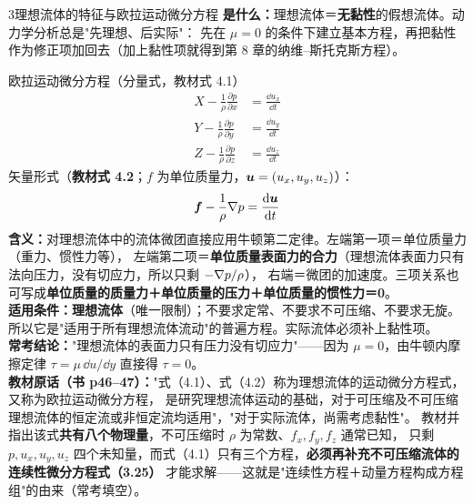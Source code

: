 \begin{kaodian}{3}{理想流体的特征与欧拉运动微分方程}
\textbf{是什么：}理想流体＝\textbf{无黏性}的假想流体。动力学分析总是"先理想、后实际"：
先在 $\mu=0$ 的条件下建立基本方程，再把黏性作为修正项加回去（加上黏性项就得到第 8 章的纳维--斯托克斯方程）。

\begin{gongshi}{欧拉运动微分方程（分量式，教材式 4.1）}
\[
\begin{aligned}
X-\frac{1}{\rho}\frac{\partial p}{\partial x}&=\frac{\dd u_x}{\dd t}\\
Y-\frac{1}{\rho}\frac{\partial p}{\partial y}&=\frac{\dd u_y}{\dd t}\\
Z-\frac{1}{\rho}\frac{\partial p}{\partial z}&=\frac{\dd u_z}{\dd t}
\end{aligned}
\]
矢量形式（\textbf{教材式 4.2}；$f$ 为单位质量力，$\bm{u}=(u_x,u_y,u_z)$）：
\[ \bm{f}-\frac{1}{\rho}\nabla p=\frac{\mathrm{d} \bm{u}}{\mathrm{d} t} \]
\textbf{含义：}对理想流体中的流体微团直接应用牛顿第二定律。左端第一项＝单位质量力（重力、惯性力等），
左端第二项＝\textbf{单位质量表面力的合力}（理想流体表面力只有法向压力，没有切应力，所以只剩 $-\nabla p/\rho$），
右端＝微团的加速度。三项关系也可写成\textbf{单位质量的质量力＋单位质量的压力＋单位质量的惯性力＝0}。\\
\textbf{适用条件：}\textbf{理想流体}（唯一限制）；不要求定常、不要求不可压缩、不要求无旋。
所以它是"适用于所有理想流体流动"的普遍方程。实际流体必须补上黏性项。\\
\textbf{常考结论：}"理想流体的表面力只有压力没有切应力"——因为 $\mu=0$，由牛顿内摩擦定律 $\tau=\mu\,\dd u/\dd y$ 直接得 $\tau=0$。\\
\textbf{教材原话（书 p46--47）：}"式（4.1）、式（4.2）称为理想流体的运动微分方程式，又称为欧拉运动微分方程，
是研究理想流体运动的基础，对于可压缩及不可压缩理想流体的恒定流或非恒定流均适用"，"对于实际流体，尚需考虑黏性"。
教材并指出该式\textbf{共有八个物理量}，不可压缩时 $\rho$ 为常数、$f_x,f_y,f_z$ 通常已知，
只剩 $p,u_x,u_y,u_z$ 四个未知量，而式（4.1）只有三个方程，\textbf{必须再补充不可压缩流体的连续性微分方程式（3.25）}
才能求解——这就是"连续性方程＋动量方程构成方程组"的由来（常考填空）。
\end{gongshi}


\end{kaodian}
